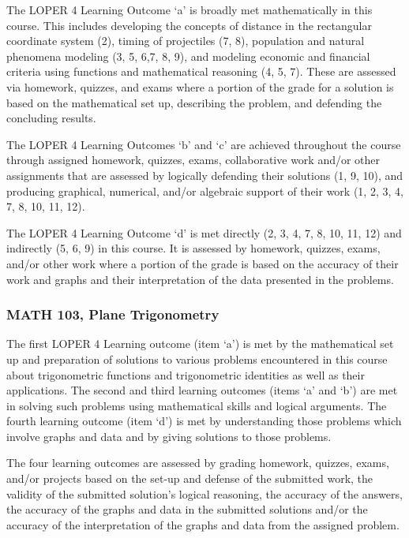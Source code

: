 \documentclass[11pt]{article}
\begin{document}
The LOPER 4 Learning Outcome `a' is broadly met mathematically 
in this course.  This includes developing the concepts of distance 
in the rectangular coordinate system (2), timing of projectiles (7, 8),  
population and natural phenomena modeling (3, 5, 6,7, 8, 9), and modeling 
economic and financial criteria using functions and mathematical reasoning (4, 5, 7).  
These are assessed via homework, quizzes, and exams where a portion of the grade 
for a solution is based on the mathematical set up, describing the problem, and 
defending the concluding results. 

The LOPER 4 Learning 
Outcomes `b' and `c' are achieved throughout the course through assigned homework, 
quizzes, exams, collaborative work and/or other assignments that are assessed by 
logically defending their solutions (1, 9, 10), and producing graphical, numerical, 
and/or algebraic support of their work (1, 2, 3, 4, 7, 8, 10, 11, 12).  

 The LOPER 4 Learning 
Outcome `d' is met directly (2, 3, 4, 7, 8, 10, 11, 12) and indirectly (5, 6, 9) 
in this course.  It is assessed by homework, quizzes, exams, and/or other work where 
a portion of the grade is based on the accuracy of their work and graphs and their 
interpretation of the data presented in the problems. 

\subsubsection{MATH 103, Plane Trigonometry} 
The first LOPER 4 Learning outcome (item `a') is met by 
the mathematical set up and preparation of solutions to various problems 
encountered in this course about trigonometric functions and 
trigonometric identities as well as their applications. The second 
and third learning outcomes (items `a' and `b') are met in solving 
such problems using 
mathematical skills and logical arguments. The fourth learning 
outcome (item `d') is met by understanding those problems which involve graphs 
and data and by giving solutions to those problems. 

The four learning 
outcomes are assessed by grading homework, quizzes, exams, and/or 
projects based on the set-up and defense of the submitted work, 
the validity of the submitted solution's logical reasoning, the 
accuracy of the answers, the accuracy of the graphs and data in the 
submitted solutions and/or the accuracy of the interpretation of the 
graphs and data from the assigned problem. 
\end{document}

